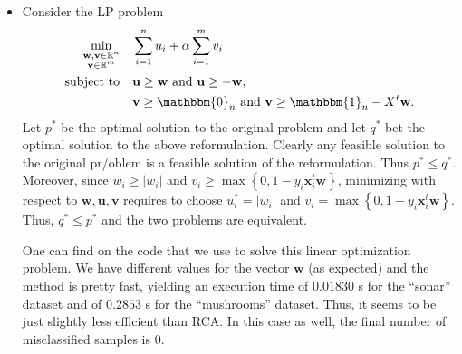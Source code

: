 \documentclass{article}
\begin{document}
\begin{itemize}
       \item Consider the LP problem
           \begin{align*}
               \min_{\substack{\mathbf{w}, \mathbf{v} \in \mathbb{R}^{n} \\
               \mathbf{v} \in \mathbb{R}^{m}}} \quad & 
               \sum_{i = 1}^{n}u_{i} + \alpha \sum_{i = 1}^{m}v_{i} \\
               \text{subject to} \quad & \mathbf{u} \geq \mathbf{w} \text{  and  } \mathbf{u} \geq -\mathbf{w}, \\
                                       & \mathbf{v} \geq \mathbbm{0}_{n} \text{  and  } \mathbf{v} \geq \mathbbm{1}_{n} - 
                                X^{t}\mathbf{w}.
           \end{align*}
           Let $p^{*}$ be the optimal solution
           to the original problem and let 
           $q^{*}$ bet the optimal solution to 
           the above reformulation. Clearly 
           any feasible solution to the original
           pr/oblem is a feasible solution
           of the reformulation.
           Thus  $p^{*} \leq q^{*}$.
           Moreover, since $w_{i} \geq \left|w_{i}\right|$
           and $v_{i} \geq \max \left\{0, 1 - y_{i}\mathbf{x}_{i}^{t}\mathbf{w}\right\}$,
           minimizing with respect to $\mathbf{w}, \mathbf{u}, \mathbf{v}$
           requires to choose $u_{i}^{*} = \left|w_{i}\right|$ 
           and $v_{i} = \max \left\{0, 1 - y_{i}\mathbf{x}_{i}^{t} \mathbf{w}\right\}$.
           Thus, $q^{*} \leq p^{*}$ and the two
           problems are equivalent.
           
           One can find on 
           the code that we use to solve this linear
           optimization problem. We have different
           values for the vector $\mathbf{w}$ (as 
           expected) and the method is 
           pretty fast, yielding an execution
           time of $0.01830$ s for the ``sonar''
           dataset and of $0.2853$ s for
           the ``mushrooms'' dataset.
           Thus, it seems to be just slightly less
           efficient than RCA.
           In this case as well, the final number
           of misclassified samples is $0$.


\end{itemize}
\end{document}
